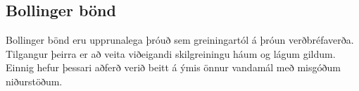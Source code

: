\documentclass{article}
\begin{document}

\subsection{Bollinger bönd}
\label{sec:bollinger_bands}


Bollinger bönd eru upprunalega þróuð sem greiningartól
á þróun verðbréfaverða. 
Tilgangur þeirra er að veita viðeigandi skilgreiningu háum og lágum gildum.
Einnig hefur þessari 
aðferð verið beitt á ýmis önnur vandamál með misgóðum niðurstöðum. \\
\end{document}
